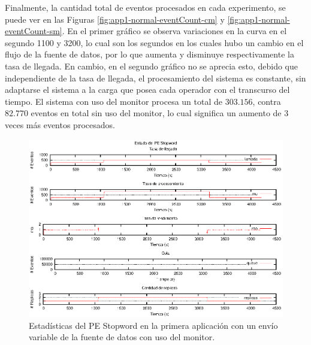 Finalmente, la cantidad total de eventos procesados en cada experimento, se puede ver en las Figuras \ref{fig:app1-normal-eventCount-cm} y \ref{fig:app1-normal-eventCount-sm}. En el primer gráfico se observa variaciones en la curva en el segundo 1100 y 3200, lo cual son los segundos en los cuales hubo un cambio en el flujo de la fuente de datos, por lo que aumenta y disminuye respectivamente la tasa de llegada. En cambio, en el segundo gráfico no se aprecia esto, debido que independiente de la tasa de llegada, el procesamiento del sistema es constante, sin adaptarse el sistema a la carga que posea cada operador con el transcurso del tiempo. El sistema con uso del monitor procesa un total de $303.156$, contra $82.770$ eventos en total sin uso del monitor, lo cual significa un aumento de 3 veces más eventos procesados.

\begin{figure}[p]
\centering
    \includegraphics[scale=1.1]{images/exp/app1/normal/cm/statusStopwordPE.eps}
    \caption{Estadísticas del PE Stopword en la primera aplicación con un envío variable de la fuente de datos con uso del monitor.}
    \label{fig:app1-normal-statusStopwordPE-cm}
\end{figure}

